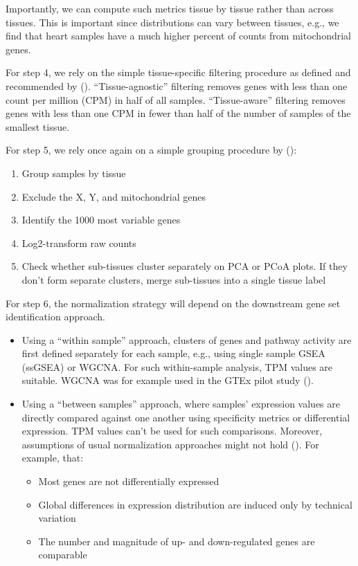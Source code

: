 \documentclass{article}
\begin{document}
Importantly, we can compute such metrics tissue by tissue rather than across tissues. This is important since distributions can vary between tissues, e.g., we find that heart samples have a much higher percent of counts from mitochondrial genes.

For step 4, we rely on the simple tissue-specific filtering procedure as defined and recommended by (\cite{Paulson2017-jv}). “Tissue-agnostic” filtering removes genes with less than one count per million (CPM) in half of all samples. “Tissue-aware” filtering removes genes with less than one CPM in fewer than half of the number of samples of the smallest tissue.

For step 5, we rely once again on a simple grouping procedure by (\cite{Paulson2017-jv}):
\begin{enumerate}
  \item Group samples by tissue
  \item Exclude the X, Y, and mitochondrial genes
  \item Identify the 1000 most variable genes
  \item Log2-transform raw counts
  \item Check whether sub-tissues cluster separately on PCA or PCoA plots. If they don't form separate clusters, merge sub-tissues into a single tissue label
\end{enumerate}

For step 6, the normalization strategy will depend on the downstream gene set identification approach.
\begin{itemize}
  \item Using a “within sample” approach, clusters of genes and pathway activity are first defined separately for each sample, e.g., using single sample GSEA (ssGSEA) or WGCNA. For such within-sample analysis, TPM values are suitable. WGCNA was for example used in the GTEx pilot study (\cite{GTEx-Consortium2015-te}).
  \item Using a “between samples” approach, where samples' expression values are directly compared against one another using specificity metrics or differential expression. TPM values can't be used for such comparisons. Moreover, assumptions of usual normalization approaches might not hold (\cite{Paulson2017-jv}). For example, that:
  \begin{itemize}
    \item Most genes are not differentially expressed
    \item Global differences in expression distribution are induced only by technical variation
    \item The number and magnitude of up- and down-regulated genes are comparable
  \end{itemize}
\end{itemize}
\end{document}
